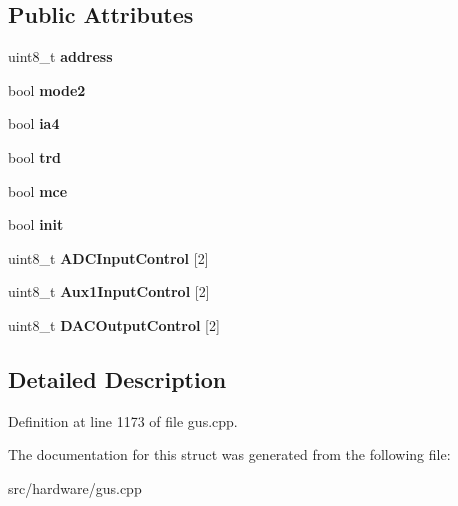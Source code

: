 \subsection*{Public Attributes}
\begin{DoxyCompactItemize}
\item 
\hypertarget{structgus__cs4231_a854196e166728ab338bd4dc1825e5376}{uint8\-\_\-t {\bfseries address}}\label{structgus__cs4231_a854196e166728ab338bd4dc1825e5376}

\item 
\hypertarget{structgus__cs4231_a1a0f1c8241e22df8912de936d6dd36a2}{bool {\bfseries mode2}}\label{structgus__cs4231_a1a0f1c8241e22df8912de936d6dd36a2}

\item 
\hypertarget{structgus__cs4231_ac856e0ff138f97283412af3a660ae48f}{bool {\bfseries ia4}}\label{structgus__cs4231_ac856e0ff138f97283412af3a660ae48f}

\item 
\hypertarget{structgus__cs4231_a98abeed198155481a7acbf4816affc16}{bool {\bfseries trd}}\label{structgus__cs4231_a98abeed198155481a7acbf4816affc16}

\item 
\hypertarget{structgus__cs4231_a6fc11df0fe6de72eaac011a4eaeb506e}{bool {\bfseries mce}}\label{structgus__cs4231_a6fc11df0fe6de72eaac011a4eaeb506e}

\item 
\hypertarget{structgus__cs4231_a1e1427d7fdd2d24972074cd552ea1e1f}{bool {\bfseries init}}\label{structgus__cs4231_a1e1427d7fdd2d24972074cd552ea1e1f}

\item 
\hypertarget{structgus__cs4231_a555b8f8e51d7a01912a32d399e50e264}{uint8\-\_\-t {\bfseries A\-D\-C\-Input\-Control} \mbox{[}2\mbox{]}}\label{structgus__cs4231_a555b8f8e51d7a01912a32d399e50e264}

\item 
\hypertarget{structgus__cs4231_ac5339efcc287958ad556d9fc7a590876}{uint8\-\_\-t {\bfseries Aux1\-Input\-Control} \mbox{[}2\mbox{]}}\label{structgus__cs4231_ac5339efcc287958ad556d9fc7a590876}

\item 
\hypertarget{structgus__cs4231_aecf705a077583ef50851864d5dd7ef53}{uint8\-\_\-t {\bfseries D\-A\-C\-Output\-Control} \mbox{[}2\mbox{]}}\label{structgus__cs4231_aecf705a077583ef50851864d5dd7ef53}

\end{DoxyCompactItemize}


\subsection{Detailed Description}


Definition at line 1173 of file gus.\-cpp.



The documentation for this struct was generated from the following file\-:\begin{DoxyCompactItemize}
\item 
src/hardware/gus.\-cpp\end{DoxyCompactItemize}
